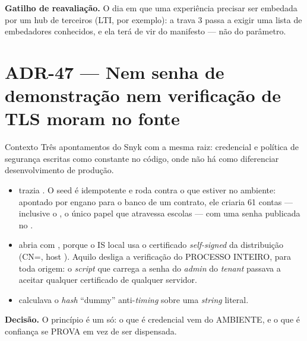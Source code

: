 \textbf{Gatilho de reavaliação.} O dia em que uma experiência precisar ser
embedada por um hub de terceiros (LTI, por exemplo): a trava 3 passa a exigir
uma lista de embedadores conhecidos, e ela terá de vir do manifesto --- não do
parâmetro.

\section{ADR-47 --- Nem senha de demonstração nem verificação de TLS moram no fonte}
\label{adr:segredo-fora-do-fonte}

\begin{especificacao}{Contexto}
Três apontamentos do Snyk com a mesma raiz: credencial e política de segurança
escritas como constante no código, onde não há como diferenciar
desenvolvimento de produção.

\begin{itemize}
  \item {} trazia .
    O seed é idempotente e roda contra o  que estiver no
    ambiente: apontado por engano para o banco de um contrato, ele criaria 61
    contas --- inclusive o , o único papel que atravessa
    escolas --- com uma senha publicada no .
  \item {} abria com
    , porque o IS local usa
    o certificado \emph{self-signed} da distribuição (CN=, host
    ). Aquilo desliga a verificação do PROCESSO INTEIRO,
    para toda origem: o \emph{script} que carrega a senha do \emph{admin} do
    \emph{tenant} passava a aceitar qualquer certificado de qualquer servidor.
  \item {} calculava o \emph{hash}
    ``dummy'' anti-\emph{timing} sobre uma \emph{string} literal.
\end{itemize}
\end{especificacao}

\textbf{Decisão.} O princípio é um só: o que é credencial vem do AMBIENTE, e o
que é confiança se PROVA em vez de ser dispensada.

